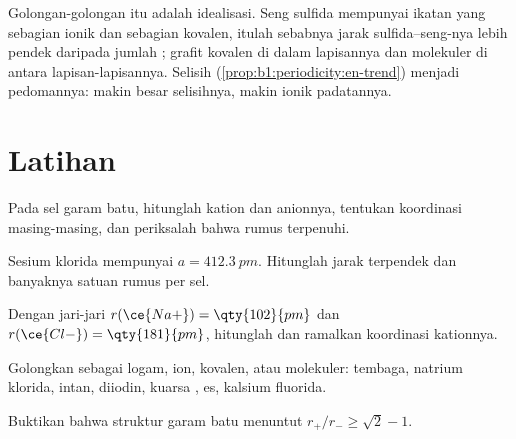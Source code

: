 \begin{remark}\label{rem:b1:crystals-ionic-covalent:continuum}
Golongan-golongan itu adalah idealisasi. Seng sulfida mempunyai ikatan
yang sebagian ionik dan sebagian kovalen, itulah sebabnya jarak
sulfida--seng-nya lebih pendek daripada jumlah ; grafit
kovalen di dalam lapisannya dan molekuler di antara lapisan-lapisannya.
Selisih  (\cref{prop:b1:periodicity:en-trend}) menjadi
pedomannya: makin besar selisihnya, makin ionik padatannya.
\end{remark}

\section{Latihan}

\begin{exercise}[$\star$]\label{exo:b1:crystals-ionic-covalent:1}
Pada sel garam batu, hitunglah kation dan anionnya, tentukan koordinasi
masing-masing, dan periksalah bahwa rumus  terpenuhi.
\end{exercise}

\begin{exercise}[$\star$]\label{exo:b1:crystals-ionic-covalent:2}
Sesium klorida mempunyai $a = \qty{412.3}{pm}$. Hitunglah jarak 
terpendek dan banyaknya satuan rumus per sel.
\end{exercise}

\begin{exercise}[$\star$]\label{exo:b1:crystals-ionic-covalent:3}
Dengan jari-jari $r(\ce{Na+}) = \qty{102}{pm}$ dan $r(\ce{Cl-}) =
\qty{181}{pm}$, hitunglah   dan ramalkan
koordinasi kationnya.
\end{exercise}

\begin{exercise}[$\star$]\label{exo:b1:crystals-ionic-covalent:4}
Golongkan sebagai logam, ion, kovalen, atau molekuler: tembaga, natrium
klorida, intan, diiodin, kuarsa , es, kalsium fluorida.
\end{exercise}

\begin{exercise}[$\star\star$]\label{exo:b1:crystals-ionic-covalent:5}
Buktikan bahwa struktur garam batu menuntut $r_+/r_- \ge \sqrt2 - 1$.
\end{exercise}

